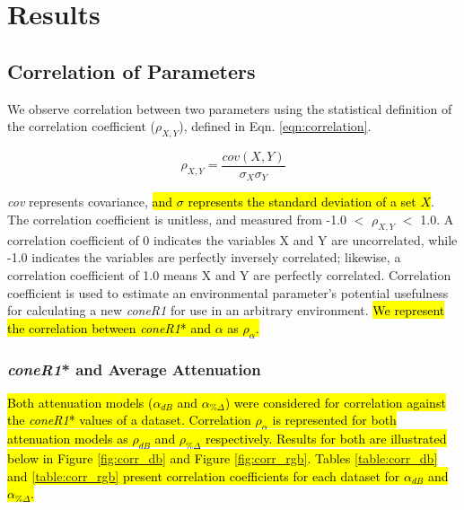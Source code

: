 \documentclass[12pt]{report}
\begin{document}
\doublespacing

\clearpage
\chapter{Results}

\section{Correlation of Parameters} \label{section:corrofparams}

We observe correlation between two parameters using the statistical definition of the correlation coefficient ($\rho_{X,Y}$), defined in Eqn. \ref{eqn:correlation}.

\begin{equation}
\rho_{X,Y} = \dfrac{cov(X,Y)}{\sigma_X\sigma_Y}
\label{eqn:correlation}
\end{equation}

\textit{cov} represents covariance, \hl{and $\sigma$ represents the standard deviation of a set $X$}. The correlation coefficient is unitless, and measured from -1.0 $<$ $\rho_{X,Y}$ $<$ 1.0. A correlation coefficient of 0 indicates the variables X and Y are uncorrelated, while -1.0 indicates the variables are perfectly inversely correlated; likewise, a correlation coefficient of 1.0 means X and Y are perfectly correlated. Correlation coefficient is used to estimate an environmental parameter's potential usefulness for calculating a new \textit{coneR1} for use in an arbitrary environment. \hl{We represent the correlation between \textit{coneR1}* and $\alpha$ as $\rho_{\alpha}$.}

\subsection{\textit{coneR1}* and Average Attenuation} \label{section:coner1andatten}

\hl{Both attenuation models ($\alpha_{dB}$ and $\alpha_{\%\Delta}$) were considered for correlation against the \textit{coneR1}* values of a dataset. Correlation $\rho_{\alpha}$ is represented for both attenuation models as $\rho_{dB}$ and $\rho_{\%\Delta}$ respectively. Results for both are illustrated below in Figure \ref{fig:corr_db} and Figure \ref{fig:corr_rgb}. Tables \ref{table:corr_db} and \ref{table:corr_rgb} present correlation coefficients for each dataset for $\alpha_{dB}$ and $\alpha_{\%\Delta}$.}
\end{document}
